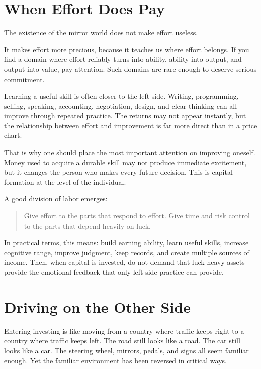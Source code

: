 \section*{When Effort Does Pay}

The existence of the mirror world does not make effort useless.

It makes effort more precious, because it teaches us where effort belongs. If you find a domain where effort reliably turns into ability, ability into output, and output into value, pay attention. Such domains are rare enough to deserve serious commitment.

Learning a useful skill is often closer to the left side. Writing, programming, selling, speaking, accounting, negotiation, design, and clear thinking can all improve through repeated practice. The returns may not appear instantly, but the relationship between effort and improvement is far more direct than in a price chart.

That is why one should place the most important attention on improving oneself. Money used to acquire a durable skill may not produce immediate excitement, but it changes the person who makes every future decision. This is capital formation at the level of the individual.

A good division of labor emerges:

\begin{quote}
Give effort to the parts that respond to effort. Give time and risk control to the parts that depend heavily on luck.
\end{quote}

In practical terms, this means: build earning ability, learn useful skills, increase cognitive range, improve judgment, keep records, and create multiple sources of income. Then, when capital is invested, do not demand that luck-heavy assets provide the emotional feedback that only left-side practice can provide.

\section*{Driving on the Other Side}

Entering investing is like moving from a country where traffic keeps right to a country where traffic keeps left. The road still looks like a road. The car still looks like a car. The steering wheel, mirrors, pedals, and signs all seem familiar enough. Yet the familiar environment has been reversed in critical ways.

